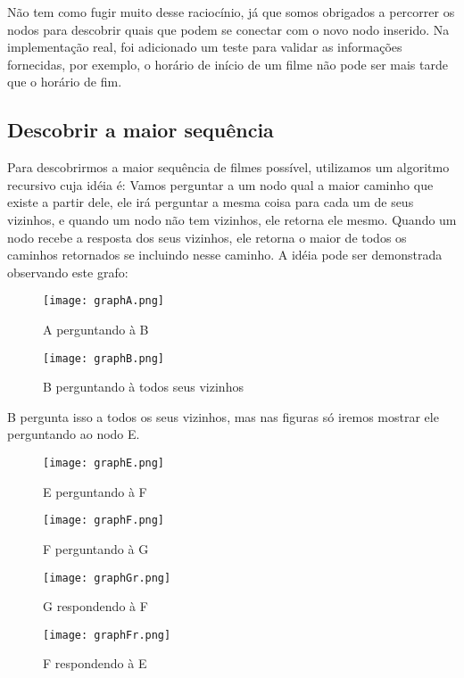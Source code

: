 \documentclass[12pt]{article}
\begin{document}
Não tem como fugir muito desse raciocínio, já que somos obrigados a percorrer os nodos para descobrir quais que podem se conectar com o novo nodo inserido. Na implementação real, foi adicionado um teste para validar as informações fornecidas, por exemplo, o horário de início de um filme não pode ser mais tarde que o horário de fim.

\subsection{Descobrir a maior sequência}

Para descobrirmos a maior sequência de filmes possível, utilizamos um algoritmo recursivo cuja idéia é: Vamos perguntar a um nodo qual a maior caminho que existe a partir dele, ele irá perguntar a mesma coisa para cada um de seus vizinhos, e quando um nodo não tem vizinhos, ele retorna ele mesmo. Quando um nodo recebe a resposta dos seus vizinhos, ele retorna o maior de todos os caminhos retornados se incluindo nesse caminho. A idéia pode ser demonstrada observando este grafo:

\begin{figure}[H]
\centering
\texttt{[image: graphA.png]}
\caption{A perguntando à B}
\label{graphA}
\end{figure}

\begin{figure}[H]
\centering
\texttt{[image: graphB.png]}
\caption{B perguntando à todos seus vizinhos}
\label{graphB}
\end{figure}

B pergunta isso a todos os seus vizinhos, mas nas figuras só iremos mostrar ele perguntando ao nodo E.

\begin{figure}[H]
\centering
\texttt{[image: graphE.png]}
\caption{E perguntando à F}
\label{graphE}
\end{figure}

\begin{figure}[H]
\centering
\texttt{[image: graphF.png]}
\caption{F perguntando à G}
\label{graphF}
\end{figure}

\begin{figure}[H]
\centering
\texttt{[image: graphGr.png]}
\caption{G respondendo à F}
\label{graphGr}
\end{figure}

\begin{figure}[H]
\centering
\texttt{[image: graphFr.png]}
\caption{F respondendo à E}
\label{graphFr}
\end{figure}
\end{document}
